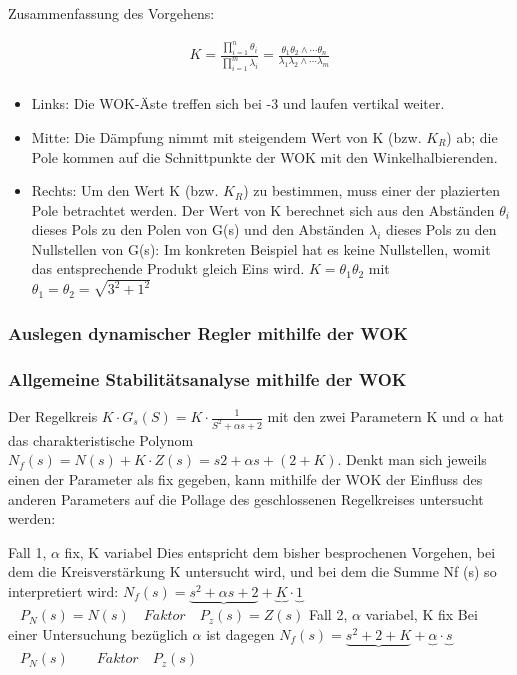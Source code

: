 \begin{multicols}{2}
Zusammenfassung des Vorgehens:

\begin{eqnarray}
	K=\frac{\prod_{i=1}^{n} \theta_i}{\prod_{i=1}^{m} \lambda_i}=\frac{\theta_1\theta_2\wedge\cdots\theta_n}{\lambda_1\lambda_2\wedge\cdots\lambda_m}\\
\end{eqnarray}
\columnbreak
\begin{itemize}
	\item  Links: Die WOK-Äste treffen sich bei -3 und laufen vertikal weiter.
	\item  Mitte: Die Dämpfung nimmt mit steigendem Wert von K (bzw. $K_R$) ab; die
	Pole kommen auf die Schnittpunkte der WOK mit den Winkelhalbierenden.
	\item  Rechts: Um den Wert K (bzw. $K_R$) zu bestimmen, muss einer der plazierten
	Pole betrachtet werden. Der Wert von K berechnet sich aus den Abständen $\theta_i$ dieses Pols zu den Polen von G(s) und den Abständen $\lambda_i$ dieses Pols zu den
	Nullstellen von G(s): Im konkreten Beispiel hat es keine Nullstellen, womit das entsprechende Produkt
	gleich Eins wird. 	$K=\theta_1\theta_2$ mit $\theta_1=\theta_2=\sqrt{3^2+1^2}$
\end{itemize}

\end{multicols}


\subsubsection{Auslegen dynamischer Regler mithilfe der WOK}


\subsubsection{Allgemeine Stabilitätsanalyse mithilfe der WOK}
Der Regelkreis $K\cdot G_s(S)=K\cdot\frac{1}{S^2+\alpha s + 2}$ mit den zwei Parametern K und $\alpha$ hat das charakteristische
Polynom $N_f(s)=N(s) + K\cdot Z(s) = s2 + \alpha s + (2 + K)$. Denkt man sich jeweils einen der
Parameter als fix gegeben, kann mithilfe der WOK der Einfluss des anderen Parameters
auf die Pollage des geschlossenen Regelkreises untersucht werden:

Fall 1, $\alpha$ fix, K variabel
Dies entspricht dem bisher besprochenen Vorgehen, bei dem die Kreisverstärkung
K untersucht wird, und bei dem die Summe Nf (s) so interpretiert wird:
$N_f(s)=\underbrace{s^2+\alpha s + 2} +\underbrace{K}\cdot\underbrace{1} $\\
\textcolor{white}{x} \hspace{12.25cm} $P_N(s)=N(s) \quad Faktor  \quad P_z(s)=Z(s)$
Fall 2, $\alpha$ variabel, K fix Bei einer Untersuchung bezüglich $\alpha$ ist dagegen
$N_f(s)=\underbrace{s^2+ 2 + K} +\underbrace{\alpha}\cdot\underbrace{s} $\\
\textcolor{white}{x} \hspace{13.5cm} $P_N(s) \qquad Faktor  \quad P_z(s)$
